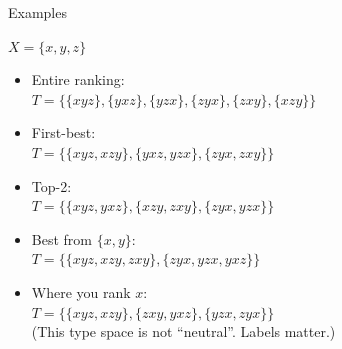 \begin{frame}{Examples}{}

$X=\{x,y,z\}$

\medskip

\begin{itemize}
\item Entire ranking:\\ $T=\{ \{xyz\}, \{yxz\}, \{yzx\}, \{zyx\}, \{zxy\}, \{xzy\} \}$

\medskip

\item First-best:\\ $T=\{ \{xyz, xzy\}, \{yxz, yzx\}, \{zyx, zxy\} \}$

\medskip

\item Top-2:\\ $T=\{ \{xyz, yxz\}, \{xzy, zxy\}, \{zyx, yzx\} \}$

\medskip

\item Best from $\{x,y\}$:\\ $T=\{ \{xyz, xzy, zxy\}, \{zyx, yzx, yxz\} \}$

%

\medskip

\item Where you rank $x$:\\ $T=\{ \{xyz, xzy\}, \{zxy, yxz\}, \{yzx, zyx\} \}$\\
(This type space is not ``neutral''. Labels matter.)
\end{itemize}


\end{frame}


